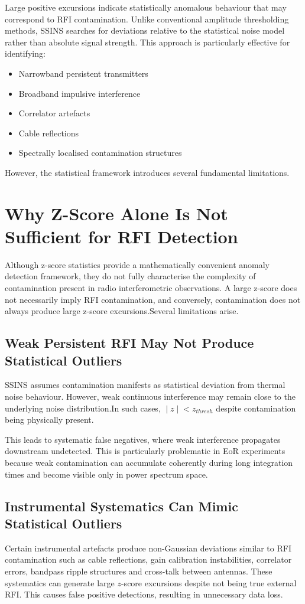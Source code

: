 \documentclass{article}
\begin{document}
Large positive excursions indicate statistically anomalous behaviour that may correspond to RFI contamination. Unlike conventional amplitude thresholding methods, SSINS searches for deviations relative to the statistical noise model rather than absolute signal strength. This approach is particularly effective for identifying:
\begin{itemize}
\item Narrowband persistent transmitters
\item Broadband impulsive interference
\item Correlator artefacts
\item Cable reflections
\item Spectrally localised contamination structures
\end{itemize}
However, the statistical framework introduces several fundamental limitations.

\section{Why Z-Score Alone Is Not Sufficient for RFI Detection}
Although z-score statistics provide a mathematically convenient anomaly detection framework, they do not fully characterise the complexity of contamination present in radio interferometric observations. A large z-score does not necessarily imply RFI contamination, and conversely, contamination does not always produce large z-score excursions.Several limitations arise.

\subsection{Weak Persistent RFI May Not Produce Statistical Outliers}
SSINS assumes contamination manifests as statistical deviation from thermal noise behaviour. However, weak continuous interference may remain close to the underlying noise distribution.In such cases, $∣z∣<z_{thresh} $ despite contamination being physically present.

This leads to systematic false negatives, where weak interference propagates downstream undetected. This is particularly problematic in EoR experiments because weak contamination can accumulate coherently during long integration times and become visible only in power spectrum space.

\subsection{Instrumental Systematics Can Mimic Statistical Outliers}
Certain instrumental artefacts produce non-Gaussian deviations similar to RFI contamination such as cable reflections, gain calibration instabilities, correlator errors, bandpass ripple structures and cross-talk between antennas. These systematics can generate large $z$-score excursions despite not being true external RFI. This causes false positive detections, resulting in unnecessary data loss.
\end{document}
